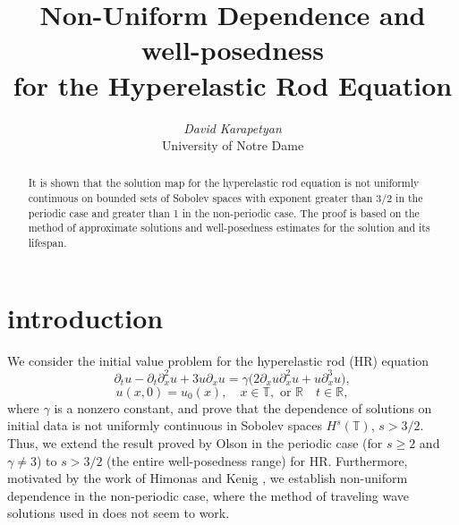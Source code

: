\documentclass[12pt,reqno]{amsart}
\newcommand{\rr}{\mathbb{R}}
\newcommand{\p}{\partial}
\newcommand{\ci}{\mathbb{T}}
\theoremstyle{plain}  %
\theoremstyle{definition}
\begin{document}
%
%
%
%
\title{Non-Uniform Dependence  and well-posedness\\
for the
Hyperelastic Rod Equation}
\author{{\it David Karapetyan}\\
University of Notre Dame}
\begin{abstract}
It is shown that the solution map for the hyperelastic rod equation is not 
uniformly continuous on bounded sets of Sobolev spaces with exponent 
greater than 3/2 in the periodic case and greater than 1 in the 
non-periodic case. The proof is based on the method of approximate 
solutions and well-posedness estimates for the solution and its lifespan.%
\end{abstract}











\maketitle
{}
\parindent0in
\parskip0.1in
%
%
\section{introduction}
\setcounter{equation}{0}
%
We consider the  initial value problem for
the hyperelastic rod (HR)  equation
%
%
\begin{equation}
\label{hr}
\p_t u
-
\p_t \p_x^2 u
+
3u\p_x u
=
\gamma \big (
2\p_x u \p_x^2 u
+
u \p_x^3 u
\big ),
\end{equation}
%
%
%
%
\begin{equation}
\label{hr-data} u(x, 0) = u_0 (x),
\quad x  \in \ci, \text{  or  } \rr \quad t \in \rr,
\end{equation}
%
%
where  $\gamma$  is a  nonzero constant,
and prove that the dependence of solutions on initial data is not uniformly 
continuous in Sobolev spaces $H^s(\ci)$, $s>3/2$.
Thus, we extend the result proved by Olson 
\cite{Olson_2006_Non-uniform-dep} in the periodic
case (for $s\ge 2$ and $\gamma \ne 3$)  to  $s>3/2$ (the entire 
well-posedness range)
for HR. Furthermore,  motivated by the work of
 Himonas  and Kenig \cite{Himonas_2009_Non-uniform-dep},
we establish non-uniform dependence
in the non-periodic case, where the method of traveling wave solutions used in  
\cite{Olson_2006_Non-uniform-dep} does not seem to work.
%
%
\end{document}
